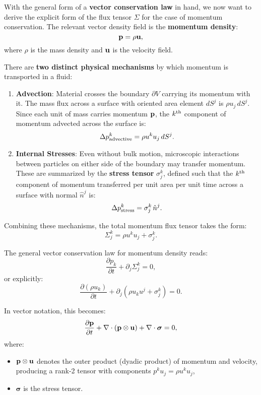 With the general form of a \textbf{vector conservation law} in hand, we now want to derive the explicit form of the flux tensor $\Sigma$ for the case of momentum conservation. The relevant vector density field is the \textbf{momentum density}:
\[
{\bf p} = \rho {\bf u},
\]
where $\rho$ is the mass density and ${\bf u}$ is the velocity field.

There are \textbf{two distinct physical mechanisms} by which momentum is transported in a fluid:

\begin{enumerate}
    \item \textbf{Advection}: Material crosses the boundary $\partial V$ carrying its momentum with it. The mass flux across a surface with oriented area element $dS^j$ is $\rho u_j \, dS^j$. Since each unit of mass carries momentum ${\bf p}$, the $k^{\rm th}$ component of momentum advected across the surface is:
    \[
    \Delta p^k_{\rm advective} = \rho u^k u_j \, dS^j.
    \]

    \item \textbf{Internal Stresses}: Even without bulk motion, microscopic interactions between particles on either side of the boundary may transfer momentum. These are summarized by the \textbf{stress tensor} $\sigma^k_j$, defined such that the $k^{\rm th}$ component of momentum transferred per unit area per unit time across a surface with normal $\hat{n}^j$ is:
    \[
    \Delta p^k_{\rm stress} = \sigma^k_j \, \hat{n}^j.
    \]
\end{enumerate}

Combining these mechanisms, the total momentum flux tensor takes the form:
\[
\Sigma^k_j = \rho u^k u_j + \sigma^k_j.
\]

The general vector conservation law for momentum density reads:
\[
\frac{\partial p_k}{\partial t} + \partial_j \Sigma^k_j = 0,
\]
or explicitly:
\[
\frac{\partial (\rho u_k)}{\partial t} + \partial_j \left( \rho u_k u^j + \sigma^k_j \right) = 0.
\]

In vector notation, this becomes:
\[
\frac{\partial {\bf p}}{\partial t} + \nabla \cdot ({\bf p} \otimes {\bf u}) + \nabla \cdot \boldsymbol{\sigma} = 0,
\]
where:
\begin{itemize}
    \item ${\bf p} \otimes {\bf u}$ denotes the outer product (dyadic product) of momentum and velocity, producing a rank-2 tensor with components $p^k u_j = \rho u^k u_j$,
    \item $\boldsymbol{\sigma}$ is the stress tensor.
\end{itemize}

